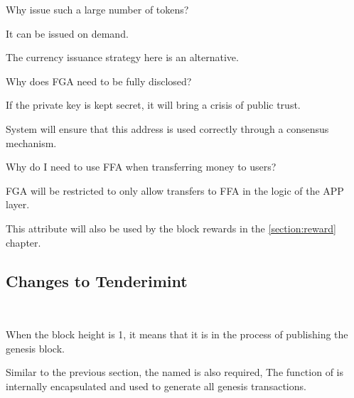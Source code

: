 \begin{ENUMERATE}
    \item Why issue such a large number of tokens?
    \begin{ITEMIZE}
        \item It can be issued on demand.
        \item The currency issuance strategy here is an alternative.
    \end{ITEMIZE}
    \item Why does FGA need to be fully disclosed?
    \begin{ITEMIZE}
        \item If the private key is kept secret, it will bring a crisis of public trust.
        \item System will ensure that this address is used correctly through a consensus mechanism.
    \end{ITEMIZE}
    \item Why do I need to use FFA when transferring money to users?
    \begin{ITEMIZE}
        \item FGA will be restricted to only allow transfers to FFA in the logic of the APP layer.
        \item This attribute will also be used by the block rewards in the \ref{section:reward} chapter.
    \end{ITEMIZE}
\end{ENUMERATE}

\clearpage

\subsection{Changes to Tenderimint}

~\par

When the block height is 1, it means that it is in the process of publishing the genesis block.

Similar to the previous section, the  named  is also required,
The function of  is internally encapsulated and used to generate all genesis transactions.

